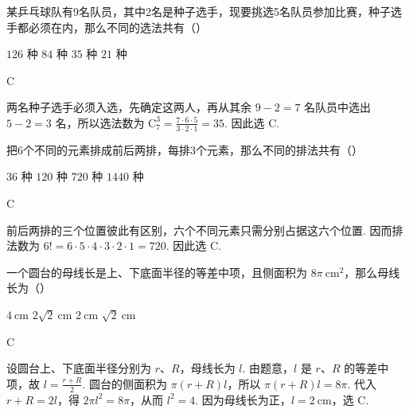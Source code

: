 \documentclass[UTF8,a4paper,oneside,11pt]{ctexbook}
\begin{document}
\begin{problem}
某乒乓球队有9名队员，其中2名是种子选手，现要挑选5名队员参加比赛，种子选手都必须在内，那么不同的选法共有（\quad）

\choices
    {\(126\) 种}
    {\(84\) 种}
    {\(35\) 种}
    {\(21\) 种}
\end{problem}

\begin{answer}
C
\end{answer}

\begin{solution}
两名种子选手必须入选，先确定这两人，再从其余 \(9-2=7\) 名队员中选出 \(5-2=3\) 名，所以选法数为
\(\mathrm C_7^3=\frac{7\cdot6\cdot5}{3\cdot2\cdot1}=35\).
因此选 C.
\end{solution}

\begin{problem}
把6个不同的元素排成前后两排，每排3个元素，那么不同的排法共有（\quad）

\choices
    {\(36\) 种}
    {\(120\) 种}
    {\(720\) 种}
    {\(1440\) 种}
\end{problem}

\begin{answer}
C
\end{answer}

\begin{solution}
前后两排的三个位置彼此有区别，六个不同元素只需分别占据这六个位置. 因而排法数为
\(6!=6\cdot5\cdot4\cdot3\cdot2\cdot1=720\).
因此选 C.
\end{solution}

\begin{problem}
一个圆台的母线长是上、下底面半径的等差中项，且侧面积为 \(8\pi \mathrm{~cm}^2\)，那么母线长为（\quad）

\choices
    {\(4\mathrm{~cm}\)}
    {\(2\sqrt{2}\mathrm{~cm}\)}
    {\(2\mathrm{~cm}\)}
    {\(\sqrt{2}\mathrm{~cm}\)}
\end{problem}

\begin{answer}
C
\end{answer}

\begin{solution}
设圆台上、下底面半径分别为 \(r\)、\(R\)，母线长为 \(l\). 由题意，\(l\) 是 \(r\)、\(R\) 的等差中项，故
\(l=\frac{r+R}{2}\). 圆台的侧面积为 \(\pi(r+R)l\)，所以 \(\pi(r+R)l=8\pi\).
代入 \(r+R=2l\)，得 \(2\pi l^2=8\pi\)，从而 \(l^2=4\). 因为母线长为正，\(l=2\mathrm{~cm}\)，选 C.
\end{solution}
\end{document}
